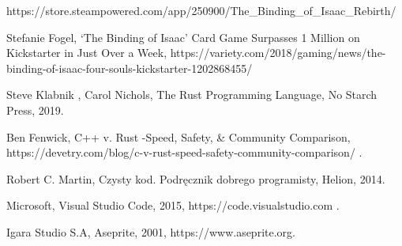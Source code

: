 \documentclass[12pt,twoside]{article}
\begin{document}
\begin{thebibliography}{4}
 https://store.steampowered.com/app/250900/The\_Binding\_of\_Isaac\_Rebirth/

 Stefanie Fogel, ‘The Binding of Isaac’ Card Game Surpasses 1 Million on Kickstarter in Just Over a Week, https://variety.com/2018/gaming/news/the-binding-of-isaac-four-souls-kickstarter-1202868455/


  Steve Klabnik , Carol Nichols, The Rust Programming Language, No Starch Press, 2019.

 Ben Fenwick, C++ v. Rust -Speed, Safety, \& Community Comparison, https://devetry.com/blog/c-v-rust-speed-safety-community-comparison/ .

 Robert C. Martin, Czysty kod. Podręcznik dobrego programisty, Helion, 2014.

 Microsoft, Visual Studio Code, 2015, https://code.visualstudio.com .

 Igara Studio S.A, Aseprite, 2001, https://www.aseprite.org.

\end{thebibliography}

\clearpage

\makesummary
\end{document}
